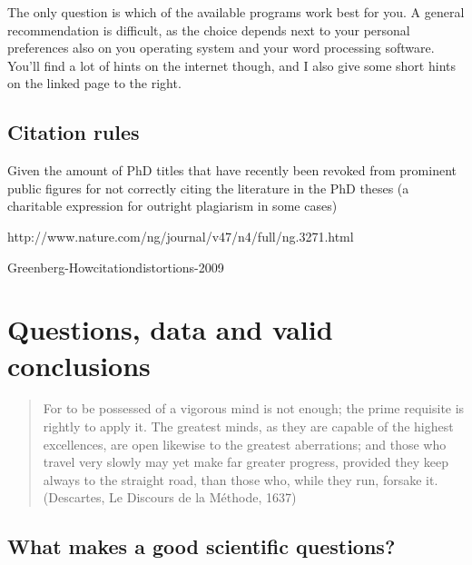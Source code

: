 \documentclass{tufte-book}
\begin{document}

The only question is which of the available programs work best for you. A general recommendation is difficult, as the choice depends next to your personal preferences also on you operating system and your word processing software. You'll find a lot of hints on the internet though, and I also give some short hints on the linked page to the right. 

\section{Citation rules}


Given the amount of PhD titles that have recently been revoked from prominent public figures for not correctly citing the literature in the PhD theses (a charitable expression for outright plagiarism in some cases)

http://www.nature.com/ng/journal/v47/n4/full/ng.3271.html

Greenberg-Howcitationdistortions-2009






\chapter{Questions, data and valid conclusions}

\begin{quote}
For to be possessed of a vigorous mind is not enough; the prime requisite is rightly to apply it. The greatest minds, as they are capable of the highest excellences, are open likewise to the greatest aberrations; and those who travel very slowly may yet make far greater progress, provided they keep always to the straight road, than those who, while they run, forsake it. (Descartes, Le Discours de la Méthode, 1637) 
\end{quote}


\section{What makes a good scientific questions?}
\end{document}
